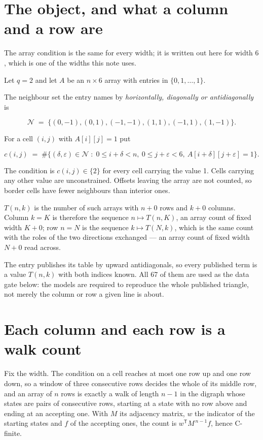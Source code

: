 \documentclass[11pt]{article}
\theoremstyle{definition}
\begin{document}
\section{The object, and what a column and a row are}

The array condition is the same for every width; it is written out here for width $6$, which is one of the widths this note uses.

Let $q = 2$ and let $A$ be an $n \times 6$ array with entries in $\{0,1,\dots,1\}$.

The neighbour set the entry names by {\itshape horizontally, diagonally or antidiagonally} is

\[\mathcal{N} \;=\; \{(0,-1), (0,1), (-1,-1), (1,1), (-1,1), (1,-1)\}.\]

For a cell $(i,j)$ with $A[i][j] = 1$ put

\[c(i,j) \;=\; \#\bigl\{(\delta,\varepsilon)\in\mathcal{N} \;:\; 0\le i+\delta<n,\ 0\le j+\varepsilon<6,\ A[i+\delta][j+\varepsilon] = 1\bigr\}.\]

The condition is $c(i,j) \in \{2\}$ for every cell carrying the value 1. Cells carrying any other value are unconstrained. Offsets leaving the array are not counted, so border cells have fewer neighbours than interior ones.

$T(n,k)$ is the number of such arrays with $n + 0$ rows and $k + 0$ columns. Column $k = K$ is therefore the sequence $n \mapsto T(n,K)$, an array count of fixed width $K + 0$; row $n = N$ is the sequence $k \mapsto T(N,k)$, which is the same count with the roles of the two directions exchanged --- an array count of fixed width $N + 0$ read across.

The entry publishes its table by upward antidiagonals, so every published term is a value $T(n,k)$ with both indices known. All 67 of them are used as the data gate below: the models are required to reproduce the whole published triangle, not merely the column or row a given line is about.

\section{Each column and each row is a walk count}

Fix the width. The condition on a cell reaches at most one row up and one row down, so a window of three consecutive rows decides the whole of its middle row, and an array of $n$ rows is exactly a walk of length $n-1$ in the digraph whose states are pairs of consecutive rows, starting at a state with no row above and ending at an accepting one. With $M$ its adjacency matrix, $w$ the indicator of the starting states and $f$ of the accepting ones, the count is $w^{\mathsf T}M^{\,n-1}f$, hence C-finite.
\end{document}
